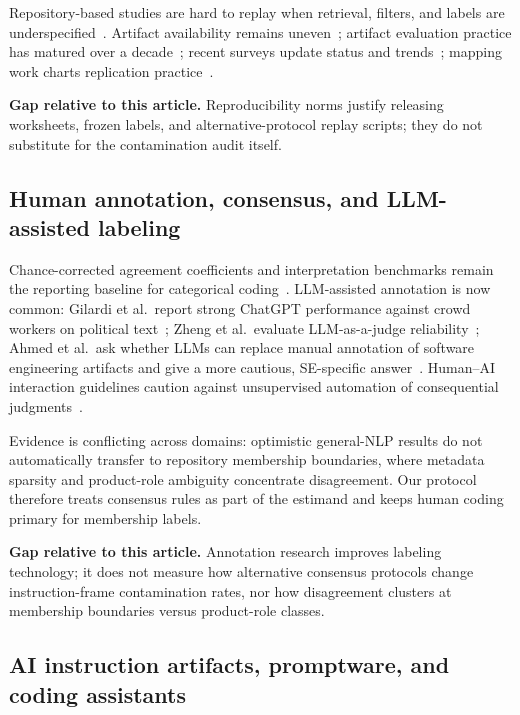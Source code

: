 Repository-based studies are hard to replay when retrieval, filters, and labels are underspecified~\cite{gonzalez2011repro,gonzalez2023revisit}.
Artifact availability remains uneven~\cite{heumuller2020artifacts}; artifact evaluation practice has matured over a decade~\cite{winter2022artifacts}; recent surveys update status and trends~\cite{liu2024artifacts}; mapping work charts replication practice~\cite{silva2014replication}.

\textbf{Gap relative to this article.}
Reproducibility norms justify releasing worksheets, frozen labels, and alternative-protocol replay scripts; they do not substitute for the contamination audit itself.

\subsection{Human annotation, consensus, and LLM-assisted labeling}
\label{subsec:rw-annotation}

Chance-corrected agreement coefficients and interpretation benchmarks remain the reporting baseline for categorical coding~\cite{cohen1960kappa,landis1977kappa}.
LLM-assisted annotation is now common: Gilardi et al.\ report strong ChatGPT performance against crowd workers on political text~\cite{gilardi2023chatgpt}; Zheng et al.\ evaluate LLM-as-a-judge reliability~\cite{zheng2023judge}; Ahmed et al.\ ask whether LLMs can replace manual annotation of software engineering artifacts and give a more cautious, SE-specific answer~\cite{ahmed2025llms}.
Human--AI interaction guidelines caution against unsupervised automation of consequential judgments~\cite{amershi2019hai}.

Evidence is conflicting across domains: optimistic general-NLP results do not automatically transfer to repository membership boundaries, where metadata sparsity and product-role ambiguity concentrate disagreement.
Our protocol therefore treats consensus rules as part of the estimand and keeps human coding primary for membership labels.

\textbf{Gap relative to this article.}
Annotation research improves labeling technology; it does not measure how alternative consensus protocols change instruction-frame contamination rates, nor how disagreement clusters at membership boundaries versus product-role classes.

\subsection{AI instruction artifacts, promptware, and coding assistants}
\label{subsec:rw-instruction}

